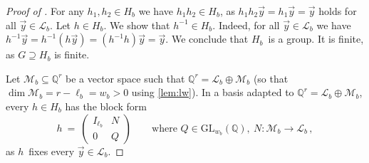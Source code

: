 \documentclass{lmcs}
\theoremstyle{definition}
\newcommand{\GL}{\mathrm{GL}}
\newcommand{\cL}{\mathcal{L}}
\newcommand{\M}{\mathcal{M}}
\newcommand{\Q}{\mathbb{Q}}
\begin{document}
\begin{proof}[Proof of ]
For any $h_1, h_2 \in H_b$ we have $h_1 h_2 \in H_b$, as $h_1 h_2 \vec{y} = h_1 \vec{y} = \vec{y}$ holds for all $\vec{y} \in \cL_b$.
Let $h \in H_b$.
We show that $h^{-1} \in H_b$.
Indeed, for all $\vec{y} \in \cL_b$ we have $h^{-1} \vec{y} = h^{-1} (h \vec{y}) = (h^{-1} h) \vec{y} = \vec{y}$.
We conclude that $H_b$~is a group.
It is finite, as $G \supseteq H_b$ is finite.

Let $\M_b \subseteq \Q^{r}$ be a vector space such that $\Q^r = \cL_b \oplus \M_b$ (so that $\dim \M_b = r - \ell_b = w_b > 0$ using \cref{lem:lw}).
In a basis adapted to $\Q^r = \cL_b \oplus \M_b$, every $h \in H_b$ has the block form
\[
 h \ = \ \begin{pmatrix} I_{\ell_b} & N \\ 0 & Q \end{pmatrix} \qquad \text{where } Q \in \GL_{w_b}(\Q),  \ N : \M_b \to \cL_b\,,
\]
as $h$~fixes every $\vec{y} \in \cL_b$.


\end{proof}
\end{document}
